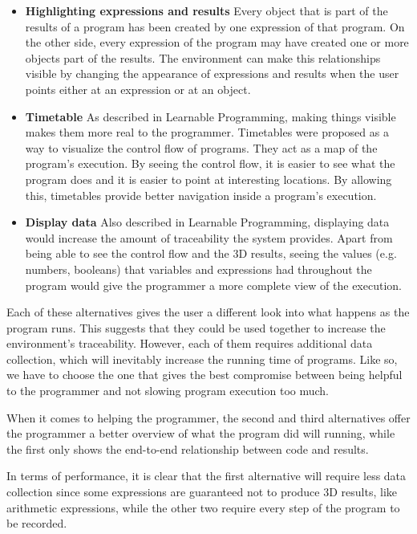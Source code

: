 \begin{itemize}
  \item {\bf Highlighting expressions and results} Every object that is part of the results of a program has been created by one expression of that program.
  On the other side, every expression of the program may have created one or more objects part of the results.
  The environment can make this relationships visible by changing the appearance of expressions and results when the user points either at an expression or at an object.

  \item {\bf Timetable} As described in Learnable Programming\cite{victor2012learnable}, making things visible makes them more real to the programmer.
  Timetables were proposed as a way to visualize the control flow of programs.
  They act as a map of the program's execution.
  By seeing the control flow, it is easier to see what the program does and it is easier to point at interesting locations.
  By allowing this, timetables provide better navigation inside a program's execution.

  \item {\bf Display data} Also described in Learnable Programming\cite{victor2012learnable}, displaying data would increase the amount of traceability the system provides.
  Apart from being able to see the control flow and the 3D results, seeing the values (e.g. numbers, booleans) that variables and expressions had throughout the program would give the programmer a more complete view of the execution.
\end{itemize}

Each of these alternatives gives the user a different look into what happens as the program runs.
This suggests that they could be used together to increase the environment's traceability.
However, each of them requires additional data collection, which will inevitably increase the running time of programs.
Like so, we have to choose the one that gives the best compromise between being helpful to the programmer and not slowing program execution too much.

When it comes to helping the programmer, the second and third alternatives offer the programmer a better overview of what the program did will running, while the first only shows the end-to-end relationship between code and results.

In terms of performance, it is clear that the first alternative will require less data collection since some expressions are guaranteed not to produce 3D results, like arithmetic expressions, while the other two require every step of the program to be recorded.


